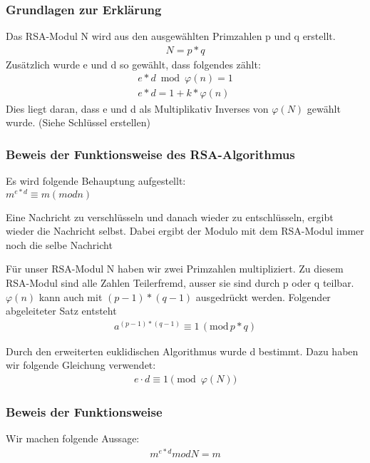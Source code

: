 \subsubsection{Grundlagen zur Erklärung}
Das RSA-Modul N wird aus den ausgewählten Primzahlen p und q erstellt.
\begin{align}
  N = p * q
\end{align}
Zusätzlich wurde e und d so gewählt, dass folgendes zählt:
\begin{align}
 e * d \bmod \varphi(n) = 1\\
 e * d = 1 + k * \varphi(n)
\end{align}
Dies liegt daran, dass e und d als Multiplikativ Inverses von $ \varphi(N) $ gewählt wurde. (Siehe Schlüssel erstellen) \\%

\subsubsection{Beweis der Funktionsweise des RSA-Algorithmus}


Es wird folgende Behauptung aufgestellt: \\
$ m^{e*d} \equiv m (mod n) $

Eine Nachricht zu verschlüsseln und danach wieder zu entschlüsseln, ergibt wieder die Nachricht selbst. Dabei ergibt der Modulo mit dem RSA-Modul immer noch die selbe Nachricht

Für unser RSA-Modul N haben wir zwei Primzahlen multipliziert. Zu diesem RSA-Modul sind alle Zahlen Teilerfremd, ausser sie sind durch p oder q teilbar. 
$ \varphi(n) $ kann auch mit $ (p-1) * (q-1) $ ausgedrückt werden. Folgender abgeleiteter Satz entsteht 
\begin{align}
  a^{(p-1) * (q-1)} \equiv 1\,(\mathrm{mod}\,p*q)
\end{align}

Durch den erweiterten euklidischen Algorithmus wurde d bestimmt. Dazu haben wir folgende Gleichung verwendet:
\begin{align}   
	e \cdot d \equiv 1 \pmod{\varphi(N)} 
\end{align}


\subsubsection{Beweis der Funktionsweise}
Wir machen folgende Aussage:
\begin{align}   
 m^{e*d} mod N = m
\end{align}

